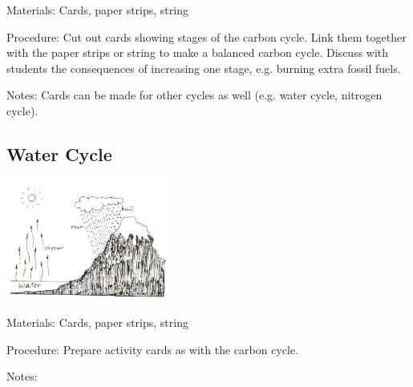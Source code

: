 \begin{multicols}{2}
\begin{description*}
\item[Materials:]{Cards, paper strips, string}
\item[Procedure:]{Cut out cards showing stages of
the carbon cycle. Link them
together with the paper strips or string to
make a balanced carbon cycle.
Discuss with students the
consequences of increasing one
stage, e.g. burning extra fossil
fuels.}
\item[Notes:]{Cards can be made for other cycles as well (e.g. water cycle, nitrogen cycle).}
\end{description*}

\subsection{Water Cycle} 

\begin{center}
\includegraphics[width=0.4\textwidth]{./img/source/water-cycle.jpg}
\end{center}

\begin{description*}
\item[Materials:]{Cards, paper strips, string}
\item[Procedure:]{Prepare activity cards as with the carbon cycle.}
\item[Notes:]{}
\end{description*}


\end{multicols}
